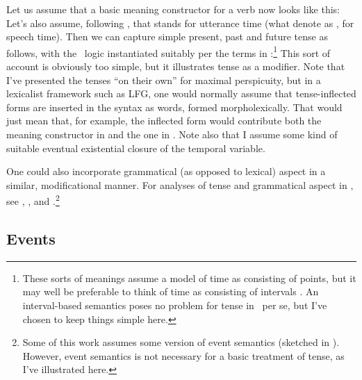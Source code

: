 \documentclass[output=paper,hidelinks]{langscibook}
\begin{document}
Let us assume that a basic meaning constructor for a verb now looks like this:
\ea \label{ex:sigh-tense} 
\z
%
Let's also assume, following \cite{haug08}, that  stands
for utterance time (what \citealt{gronn;stechow16} denote as
, for speech time). Then we can capture simple present,
past and future tense as follows, with the \glue\ logic instantiated
suitably per the terms in :\footnote{These sorts of
  meanings assume a model of time as consisting of points, but it may
  well be preferable to think of time as consisting of intervals
  \citep{Dowty1979}. An interval-based semantics poses no problem for
  tense in \glues\ per se, but I've chosen to keep things simple here.}
\ea
\label{ex:tense-mcs}
  \ea
{} 
\ex {}  
\ex {}
  \z
\z
% 
This sort of account is obviously too simple, but it illustrates tense
as a modifier. Note that I've presented the tenses ``on their own''
for maximal perspicuity, but in a lexicalist framework such as LFG,
one would normally assume that tense-inflected forms are inserted in
the syntax as words, formed morpholexically. That would just mean
that, for example, the inflected form  would contribute
both the meaning constructor in  and the one in
. Note also that I assume some kind of suitable
eventual existential closure of the temporal variable. 

One could also incorporate grammatical (as opposed to lexical) aspect
in a similar, modificational manner. For analyses of tense and
grammatical aspect in \glues, see \citet{haug08}, \citet{bary;haug11},
and \citet{Lowe2014,lowe15-sanskrit}.\footnote{Some of this work assumes some version
  of event 
  semantics (sketched in
  ). However, event semantics is
  not necessary for a basic treatment of tense, as I've illustrated
  here.}

\subsection{Events}
\label{sec:events}
\end{document}
